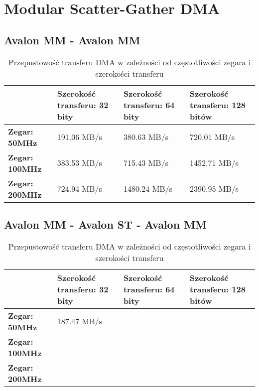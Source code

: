 \chapter{Modular Scatter-Gather DMA}

\section{Avalon MM - Avalon MM}

\begin{table}[h]
    \centering
    \renewcommand{\arraystretch}{1.2}
    \begin{tabular}{|l|p{3cm}|p{3cm}|p{3cm}|}
    \hline
     & \textbf{Szerokość transferu: 32 bity} & \textbf{Szerokość transferu: 64 bity} & \textbf{Szerokość transferu: 128 bitów} \\ \hline
    \textbf{Zegar: 50MHz} & {191.06 MB/s} & {380.63 MB/s} & {720.01 MB/s} \\ \hline
    \textbf{Zegar: 100MHz} & {383.53 MB/s} & {715.43 MB/s} & {1452.71 MB/s} \\ \hline
    \textbf{Zegar: 200MHz} & {724.94 MB/s} & {1480.24 MB/s}  & {2390.95 MB/s} \\ \hline
    \end{tabular}
    \caption{Przepustowość transferu DMA w zależności od częstotliwości zegara i szerokości transferu}
    \label{tab:mm_mm}
\end{table}



\section{Avalon MM - Avalon ST - Avalon MM}

\begin{table}[h]
    \centering
    \begin{tabular}{|l|p{3.5cm}|p{3.5cm}|p{3.5cm}|}
    \hline
    & \textbf{Szerokość transferu: 32 bity} & \textbf{Szerokość transferu: 64 bity} & \textbf{Szerokość transferu: 128 bitów} \\ \hline
    \textbf{Zegar: 50MHz} & {187.47 MB/s} & {} & {} \\ \hline
    \textbf{Zegar: 100MHz} & {} & {} & {} \\ \hline
    \textbf{Zegar: 200MHz} & {} & {}  & {} \\ \hline
    \end{tabular}
    \caption{Przepustowość transferu DMA w zależności od częstotliwości zegara i szerokości transferu}
    \label{tab:mm_st}
\end{table}